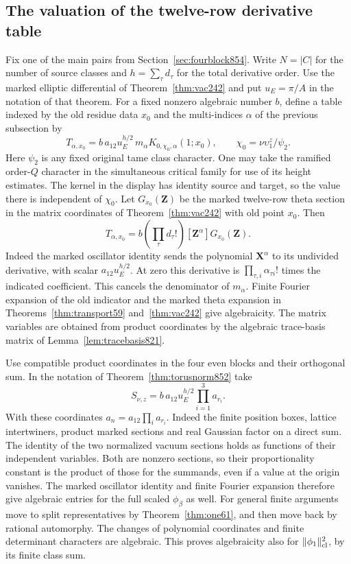 \documentclass[a4paper,11pt]{article}
\theoremstyle{definition}
\theoremstyle{remark}
\numberwithin{equation}{section}
\begin{document}
\subsection{The valuation of the twelve-row derivative table}
\label{sec:twelftransfer855}
Fix one of the main pairs from Section~\ref{sec:fourblock854}.
Write \(N=|C|\) for the number of source classes and
\(h=\sum_\tau d_\tau\) for the total derivative order. Use
the marked elliptic differential of Theorem~\ref{thm:vac242}
and put \(u_E=\pi/A\) in the notation of that theorem.
For a fixed nonzero algebraic number \(b\), define a table
indexed by the old residue data \(x_0\) and the multi-indices
\(\alpha\) of the previous subsection by
\[
   T_{\alpha,x_0}
     =b\,a_{12}u_E^{h/2}\,
          m_\alpha K_{0,\chi_0,\alpha}(1;x_0),\qquad
       \chi_0=\nu\upsilon_1^z/\psi_2 .
\]
Here \(\psi_2\) is any fixed original tame class character.
One may take the ramified order-\(Q\) character in the
simultaneous critical family for use of its height estimates.
The kernel in the display has identity source and target, so
the value there is independent of \(\chi_0\).
Let \(G_{x_0}(\mathbf Z)\) be the marked twelve-row theta section
in the matrix coordinates of Theorem~\ref{thm:vac242} with
old point \(x_0\). Then
\begin{equation}
 T_{\alpha,x_0}
     =b\left(\prod_\tau d_\tau!\right)
                      [\mathbf Z^\alpha]G_{x_0}(\mathbf Z).
 \label{eq:derivtable855}
\end{equation}
Indeed the marked oscillator identity sends the polynomial
\(\mathbf X^\alpha\) to its undivided derivative, with scalar
\(a_{12}u_E^{h/2}\). At zero this derivative is
\(\prod_{\tau,i}\alpha_{\tau i}!\) times the indicated coefficient.
This cancels the denominator of \(m_\alpha\).
Finite Fourier expansion of the old indicator and the marked
theta expansion in Theorems~\ref{thm:transport59} and~\ref{thm:vac242}
give algebraicity. The matrix variables are obtained from
product coordinates by the algebraic trace-basis matrix of
Lemma~\ref{lem:tracebasis821}.

Use compatible product coordinates in the four even blocks
and their orthogonal sum. In the notation of
Theorem~\ref{thm:torusnorm852} take
\[
       S_{\nu,z}=b\,a_{12}u_E^{h/2}\prod_{i=1}^3 a_{r_i}.
\]
With these coordinates \(a_n=a_{12}\prod_i a_{r_i}\).
Indeed the finite position boxes, lattice intertwiners,
product marked sections and real Gaussian factor on a
direct sum. The identity of the two normalized vacuum
sections holds as functions of their independent variables.
Both are nonzero sections, so their proportionality constant
is the product of those for the summands, even if a value
at the origin vanishes. The marked oscillator identity and
finite Fourier expansion therefore give algebraic entries
for the full scaled \(\phi_\beta\) as well. For general finite
arguments move to split representatives by
Theorem~\ref{thm:one61}, and then move back by rational
automorphy. The changes of polynomial coordinates and
finite determinant characters are algebraic. This proves
algebraicity also for \(\|\phi_1\|_{\rm cl}^2\), by its finite
class sum.
\end{document}
